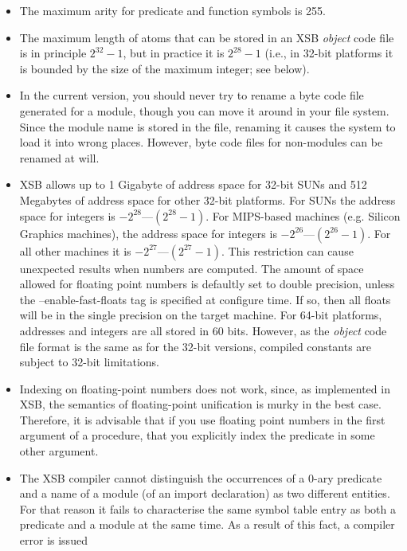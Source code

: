 \begin{itemize}
\item The maximum arity for predicate and function symbols is 255.
%
\item The maximum length of atoms that can be stored in an XSB
      \emph{object} code file is in principle $2^{32}-1$, but in
      practice it is $2^{28}-1$ (i.e., in 32-bit platforms it is
      bounded by the size of the maximum integer; see below).
%
\item In the current version, you should never try to rename a byte code 
      file generated for a module, though you can move it around in your 
      file system.  Since the module name is stored in the file, renaming it
      causes the system to load it into wrong places.  However, byte code 
      files for non-modules can be renamed at will.
%
\item XSB allows up to 1 Gigabyte of address space for 32-bit SUNs and 512
      Megabytes of address space for other 32-bit platforms.  For SUNs the
      address space for integers is $-2^{28}$---$(2^{28}-1)$.  For
      MIPS-based machines (e.g. Silicon Graphics machines), the
      address space for integers is $-2^{26}$---$(2^{26}-1)$.  For all
      other machines it is $-2^{27}$---$(2^{27}-1)$.  This restriction can
      cause unexpected results when numbers are computed.  The amount
      of space allowed for floating point numbers is defaultly set to double
      precision, unless the --enable-fast-floats tag is specified at configure time.
      If so, then all floats will be in the single precision on the target machine. 
      For 64-bit platforms, addresses and integers are all stored in 60 bits. 
      However, as the \emph{object} code file format is the same as for the 
      32-bit versions, compiled constants are subject to 32-bit limitations.
%
\item	Indexing on floating-point numbers does not work, since, as
implemented in XSB, the semantics
      of floating-point unification is murky in the best case. Therefore, it
      is advisable that if you use floating point numbers in the first 
      argument of a procedure,  that you explicitly index the
      predicate in some other argument.
%
\item	The XSB compiler cannot distinguish the occurrences of a
      0-ary predicate and a name of a module (of an import declaration) as
      two different entities.  For that reason it fails to characterise the
      same symbol table entry as both a predicate and a module at the
      same time.  As a result of this fact, a compiler error is issued

\end{itemize}
